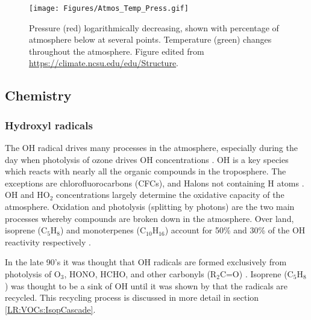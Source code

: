     \begin{figure}
      \texttt{[image: Figures/Atmos\_Temp\_Press.gif]}
      \caption{%
        Pressure (red) logarithmically decreasing, shown with percentage of atmosphere below at several points.
        Temperature (green) changes throughout the atmosphere.
        Figure edited from \url{https://climate.ncsu.edu/edu/Structure}.
      }
      \label{LR:Atmos:Struct:Fig_atmos_layers}
    \end{figure}
    
    
    
    
    
    
  \subsection{Chemistry}
  \label{LR:Atmos:Chem}
    \subsubsection{Hydroxyl radicals}
      The OH radical drives many processes in the atmosphere, especially during the day when photolysis of ozone drives OH concentrations \citep{Atkinson2000}.    
      OH is a key species which reacts with nearly all the organic compounds in the troposphere.
      The exceptions are chlorofluorocarbons (CFCs), and Halons not containing H atoms \citep{Atkinson2000}.
      OH and HO$_2$ concentrations largely determine the oxidative capacity of the atmosphere.
      Oxidation and photolysis (splitting by photons) are the two main processes whereby compounds are broken down in the atmosphere.
      Over land, isoprene (C$_5$H$_8$) and monoterpenes (C$_10$H$_16$) account for 50\% and 30\% of the OH reactivity respectively \citep{Fuentes2000}.
      
      In the late 90's it was thought that OH radicals are formed exclusively from photolysis of O$_3$, HONO, HCHO, and other carbonyls (R$_2$C=O) \cite{Atkinson2000}.
      Isoprene (C$_5$H$_8$) was thought to be a sink of OH until it was shown by \cite{Paulot2009b} that the radicals are recycled.
      This recycling process is discussed in more detail in section \ref{LR:VOCs:IsopCascade}.
      

